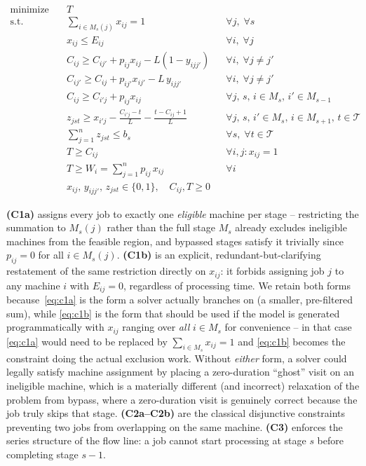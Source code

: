 \documentclass[11pt,a4paper]{article}
\begin{document}
\begin{align}
  \text{minimize} \quad & T \label{eq:obj}\\[4pt]
  \text{s.t.}\quad
  &\sum_{i \in M_s(j)} x_{ij} = 1
    && \forall j,\; \forall s \tag{C1a}\label{eq:c1a}\\
  &x_{ij} \le E_{ij}
    && \forall i,\; \forall j \tag{C1b}\label{eq:c1b}\\
  &C_{ij} \ge C_{ij'} + p_{ij} x_{ij} - L(1 - y_{ijj'})
    && \forall i,\; \forall j \neq j' \tag{C2a}\label{eq:c2a}\\
  &C_{ij'} \ge C_{ij} + p_{ij'} x_{ij'} - L\, y_{ijj'}
    && \forall i,\; \forall j \neq j' \tag{C2b}\label{eq:c2b}\\
  &C_{ij} \ge C_{i'j} + p_{ij} x_{ij}
    && \forall j,\, s,\, i \in M_s,\, i' \in M_{s-1} \tag{C3}\label{eq:c3}\\[4pt]
  &z_{jst} \ge x_{i'j} - \frac{C_{i'j} - t}{L} - \frac{t - C_{ij} + 1}{L}
    && \forall j,\, s,\, i' \in M_s,\, i \in M_{s+1},\, t \in \mathcal{T}
    \tag{C4a}\label{eq:c4a}\\
  &\sum_{j=1}^{n} z_{jst} \le b_s
    && \forall s,\; \forall t \in \mathcal{T} \tag{C4b}\label{eq:c4b}\\[4pt]
  &T \ge C_{ij}
    && \forall i,j : x_{ij}=1 \tag{C5}\label{eq:c5}\\
  &T \ge W_i = \sum_{j=1}^{n} p_{ij}\, x_{ij}
    && \forall i \tag{C6}\label{eq:c6}\\
  &x_{ij},\, y_{ijj'},\, z_{jst} \in \{0,1\},\quad C_{ij}, T \ge 0
    \tag{C7}\label{eq:c7}
\end{align}

\noindent
\textbf{(C1a)} assigns every job to exactly one \emph{eligible} machine
per stage -- restricting the summation to $M_s(j)$ rather than the full
stage $M_s$ already excludes ineligible machines from the feasible
region, and bypassed stages satisfy it trivially since $p_{ij}=0$ for all
$i \in M_s(j)$. \textbf{(C1b)} is an explicit, redundant-but-clarifying
restatement of the same restriction directly on $x_{ij}$: it forbids
assigning job $j$ to any machine $i$ with $E_{ij}=0$, regardless of
processing time. We retain both forms because~\eqref{eq:c1a} is the
form a solver actually branches on (a smaller, pre-filtered sum), while
\eqref{eq:c1b} is the form that should be used if the model is
generated programmatically with $x_{ij}$ ranging over \emph{all} $i \in
M_s$ for convenience -- in that case \eqref{eq:c1a} would need to be
replaced by $\sum_{i \in M_s} x_{ij} = 1$ and \eqref{eq:c1b} becomes the
constraint doing the actual exclusion work. Without \emph{either} form,
a solver could legally satisfy machine assignment by placing a
zero-duration ``ghost'' visit on an ineligible machine, which is a
materially different (and incorrect) relaxation of the problem from
bypass, where a zero-duration visit is genuinely correct because the
job truly skips that stage. \textbf{(C2a--C2b)} are the classical
disjunctive constraints preventing two jobs from overlapping on the same
machine. \textbf{(C3)} enforces the series structure of the flow line: a
job cannot start processing at stage $s$ before completing stage $s-1$.
\end{document}
